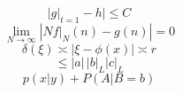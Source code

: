 \documentclass{article}
\begin{document}
\[ \bigg|g\big|_{t=1}-h\bigg|\leq C \]
\[ \lim_{N\to\infty}|Nf\big|_{N}(n)-g(n)|=0 \]
\[ \delta(\xi)\asymp|\xi-\phi(x)|\asymp r \]
\[ \leq|a|\,|b|_{L}|c|_{L} \]
\[ p(x|y)+P(A|B=b) \]
\end{document}
